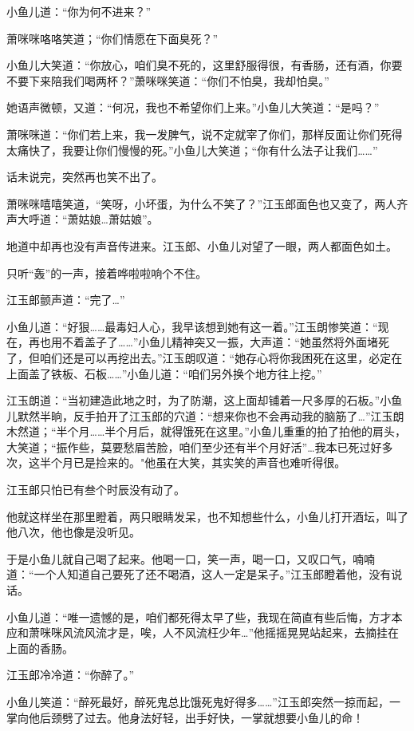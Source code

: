 \documentclass[12pt,oneside]{book}
\begin{document}
小鱼儿道：``你为何不进来？''

萧咪咪咯咯笑道；``你们情愿在下面臭死？''

小鱼儿大笑道：``你放心，咱们臭不死的，这里舒服得很，有香肠，还有酒，你要不要下来陪我们喝两杯？''萧咪咪笑道：``你们不怕臭，我却怕臭。''

她语声微顿，又道：``何况，我也不希望你们上来。''小鱼儿大笑道：``是吗？''

萧咪咪道：``你们若上来，我一发脾气，说不定就宰了你们，那样反面让你们死得太痛快了，我要让你们慢慢的死。''小鱼儿大笑道；``你有什么法子让我们\ldots\ldots{}''

话未说完，突然再也笑不出了。

萧咪咪嘻嘻笑道，``笑呀，小坏蛋，为什么不笑了？''江玉郎面色也又变了，两人齐声大呼道：``萧姑娘\ldots 萧姑娘''。

地道中却再也没有声音传进来。江玉郎、小鱼儿对望了一眼，两人都面色如土。

只听``轰''的一声，接着哗啦啦响个不住。

江玉郎颤声道：``完了\ldots{}''

小鱼儿道：``好狠\ldots\ldots 最毒妇人心，我早该想到她有这一着。''江玉朗惨笑道：``现在，再也用不着盖子了\ldots\ldots{}''小鱼儿精神突又一振，大声道：``她虽然将外面堵死了，但咱们还是可以再挖出去。''江玉朗叹道：``她存心将你我困死在这里，必定在上面盖了铁板、石板\ldots\ldots{}''小鱼儿道：``咱们另外换个地方往上挖。''

江玉朗道：``当初建造此地之时，为了防潮，这上面却铺着一尺多厚的石板。''小鱼儿默然半晌，反手拍开了江玉郎的穴道：``想来你也不会再动我的脑筋了\ldots{}''江玉朗木然道；``半个月\ldots\ldots 半个月后，就得饿死在这里。''小鱼儿重重的拍了拍他的肩头，大笑道；``振作些，莫要愁眉苦脸，咱们至少还有半个月好活''\ldots 我本已死过好多次，这半个月已是捡来的。"他虽在大笑，其实笑的声音也难听得很。

江玉郎只怕已有叁个时辰没有动了。

他就这样坐在那里瞪着，两只眼睛发呆，也不知想些什么，小鱼儿打开酒坛，叫了他八次，他也像是没听见。

于是小鱼儿就自己喝了起来。他喝一口，笑一声，喝一口，又叹口气，喃喃道：``一个人知道自己要死了还不喝酒，这人一定是呆子。''江玉郎瞪着他，没有说话。

小鱼儿道：``唯一遗憾的是，咱们都死得太早了些，我现在简直有些后悔，方才本应和萧咪咪风流风流才是，唉，人不风流枉少年\ldots{}''他摇摇晃晃站起来，去摘挂在上面的香肠。

江玉郎冷冷道：``你醉了。''

小鱼儿笑道：``醉死最好，醉死鬼总比饿死鬼好得多\ldots\ldots{}''江玉郎突然一掠而起，一掌向他后颈劈了过去。他身法好轻，出手好快，一掌就想要小鱼儿的命！
\end{document}
